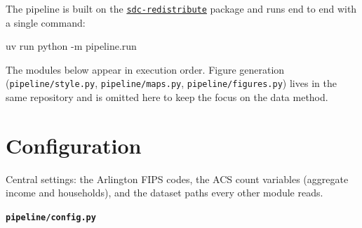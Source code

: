 \documentclass[
  letterpaper,
  DIV=11,
  numbers=noendperiod]{scrreprt}
\newenvironment{Shaded}{\begin{snugshade}}{\end{snugshade}}
\newcommand{\AttributeTok}[1]{\textcolor[rgb]{0.40,0.45,0.13}{#1}}
\newcommand{\ExtensionTok}[1]{\textcolor[rgb]{0.00,0.23,0.31}{#1}}
\newcommand{\NormalTok}[1]{\textcolor[rgb]{0.00,0.23,0.31}{#1}}
\begin{document}
The pipeline is built on the
\href{https://pypi.org/project/sdc-redistribute/}{\texttt{sdc-redistribute}}
package and runs end to end with a single command:

\begin{Shaded}
\begin{Highlighting}[]
\ExtensionTok{uv}\NormalTok{ run python }\AttributeTok{{-}m}\NormalTok{ pipeline.run}
\end{Highlighting}
\end{Shaded}

The modules below appear in execution order. Figure generation
(\texttt{pipeline/style.py}, \texttt{pipeline/maps.py},
\texttt{pipeline/figures.py}) lives in the same repository and is
omitted here to keep the focus on the data method.

\section{Configuration}\label{configuration}

Central settings: the Arlington FIPS codes, the ACS count variables
(aggregate income and households), and the dataset paths every other
module reads.

\textbf{\texttt{pipeline/config.py}}
\end{document}
